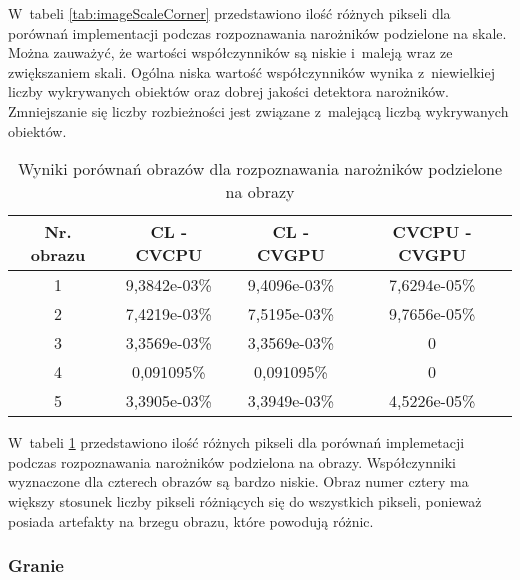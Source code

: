 W~tabeli \ref{tab:imageScaleCorner} przedstawiono ilość różnych pikseli dla porównań implementacji podczas rozpoznawania narożników podzielone na skale. Można zauważyć, że wartości współczynników są niskie i~maleją wraz ze zwiększaniem skali. Ogólna niska wartość współczynników wynika z~niewielkiej liczby wykrywanych obiektów oraz dobrej jakości detektora narożników. Zmniejszanie się liczby rozbieżności jest związane z~malejącą liczbą wykrywanych obiektów.

\begin{center}
\begin{table}
\centering
\caption{Wyniki porównań obrazów dla rozpoznawania narożników podzielone na obrazy}
\label{tab:imageImageCorner}
\begin{tabular}{|c|c|c|c|}
\hline
Nr. obrazu & CL - CVCPU & CL - CVGPU & CVCPU - CVGPU \\ \hline
1 & 9,3842e-03\% & 9,4096e-03\% & 7,6294e-05\% \\ \hline
2 & 7,4219e-03\% & 7,5195e-03\% & 9,7656e-05\% \\ \hline
3 & 3,3569e-03\% & 3,3569e-03\% & 0 \\ \hline
4 & 0,091095\% & 0,091095\% & 0 \\ \hline
5 & 3,3905e-03\% & 3,3949e-03\% & 4,5226e-05\% \\ \hline
\end{tabular}
\end{table}
\end{center}

W~tabeli \ref{tab:imageImageCorner} przedstawiono ilość różnych pikseli dla porównań implemetacji podczas rozpoznawania narożników podzielona na obrazy. Współczynniki wyznaczone dla czterech obrazów są bardzo niskie. Obraz numer cztery ma większy stosunek liczby pikseli różniących się do wszystkich pikseli, ponieważ posiada artefakty na brzegu obrazu, które powodują różnic.


\subsubsection{Granie}
\label{subsubsec:granieTabele}

